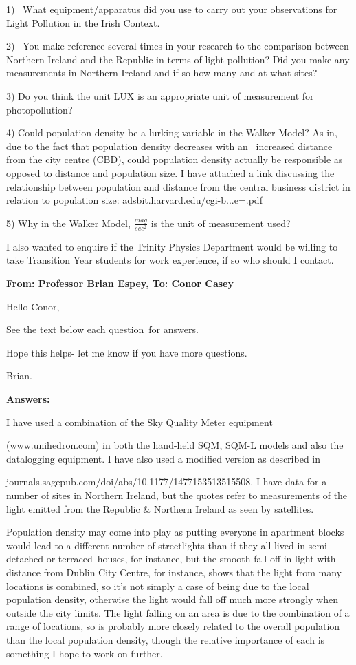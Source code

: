 \begin{appendix}
1)  What equipment/apparatus did you use to carry out your observations for Light Pollution in the Irish Context.

2)  You make reference several times in your research to the comparison between Northern Ireland and the Republic in terms of light pollution? Did you make any measurements in Northern Ireland and if so how many and at what sites?

3) Do you think the unit LUX is an appropriate unit of measurement for photopollution?

4) Could population density be a lurking variable in the Walker Model? As in, due to the fact that population density decreases with an  increased distance from the city centre (CBD), could population density actually be responsible as opposed to distance and population size. I have attached a link discussing the relationship between population and distance from the central business district in relation to population size:
adsbit.harvard.edu/cgi-b...e=.pdf

5) Why in the Walker Model, $\frac{mag}{sec^{2}}$ is the unit of measurement used?

I also wanted to enquire if the Trinity Physics Department would be willing to take Transition Year students for work experience, if so who should I contact.


\textbf{From: Professor Brian Espey, To: Conor Casey}

Hello Conor,

See the text below each question for answers.

Hope this helps- let me know if you have more questions.

Brian.

\textbf{Answers:}

I have used a combination of the Sky Quality Meter equipment

(www.unihedron.com) in both the hand-held SQM, SQM-L models and also the datalogging equipment. I have also used a modified version as described in  

journals.sagepub.com/doi/abs/10.1177/1477153513515508.
I have data for a number of sites in Northern Ireland, but the quotes refer to measurements of the light emitted from the Republic \& Northern Ireland as seen by satellites.

Population density may come into play as putting everyone in apartment blocks would lead to a different number of streetlights than if they all lived in semi-detached or terraced houses, for instance, but the smooth fall-off in light with distance from Dublin City Centre, for instance, shows that the light from many locations is combined, so it's not simply a case of being due to the local population density, otherwise the light would fall off much more strongly when outside the city limits. The light falling on an area is due to the combination of a range of locations, so is probably more closely related to the overall population than the local population density, though the relative importance of each is something I hope to work on further.


\end{appendix}
